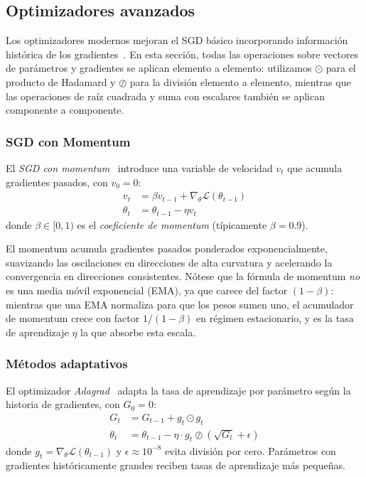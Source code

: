 \subsection{Optimizadores avanzados}\label{subsec:optimizadores_avanzados}

Los optimizadores modernos mejoran el \gls{SGD} básico incorporando información histórica de los gradientes~\citep{kingma2014adam, duchi2011adagrad}. En esta sección, todas las operaciones sobre vectores de parámetros y gradientes se aplican elemento a elemento: utilizamos \(\odot\) para el producto de Hadamard y \(\oslash\) para la división elemento a elemento, mientras que las operaciones de raíz cuadrada y suma con escalares también se aplican componente a componente.

\subsubsection{SGD con Momentum}

\begin{definition}\label{def:sgd_momentum}
	El \textit{SGD con momentum}~\citep{polyak1964methods} introduce una variable de velocidad \(v_t\) que acumula gradientes pasados, con \(v_0 = 0\):
	\begin{align*}
		v_t &= \beta v_{t-1} + \nabla_\theta \mathcal{L}(\theta_{t-1}) \\
		\theta_t &= \theta_{t-1} - \eta v_t
	\end{align*}
	donde \(\beta \in [0,1)\) es el \textit{coeficiente de momentum} (típicamente \(\beta = 0.9\)).
\end{definition}

El momentum acumula gradientes pasados ponderados exponencialmente, suavizando las oscilaciones en direcciones de alta curvatura y acelerando la convergencia en direcciones consistentes. Nótese que la fórmula de momentum \textit{no} es una media móvil exponencial (EMA), ya que carece del factor \((1-\beta)\): mientras que una EMA normaliza para que los pesos sumen uno, el acumulador de momentum crece con factor \(1/(1-\beta)\) en régimen estacionario, y es la tasa de aprendizaje \(\eta\) la que absorbe esta escala.

\subsubsection{Métodos adaptativos}

\begin{definition}[Adagrad]\label{def:adagrad}
	El optimizador \textit{Adagrad}~\citep{duchi2011adagrad} adapta la tasa de aprendizaje por parámetro según la historia de gradientes, con \(G_0 = 0\):
	\begin{align*}
		G_t &= G_{t-1} + g_t \odot g_t \\
		\theta_t &= \theta_{t-1} - \eta \cdot g_t \oslash (\sqrt{G_t} + \epsilon)
	\end{align*}
	donde \(g_t = \nabla_\theta \mathcal{L}(\theta_{t-1})\) y \(\epsilon \approx 10^{-8}\) evita división por cero. Parámetros con gradientes históricamente grandes reciben tasas de aprendizaje más pequeñas.
\end{definition}

